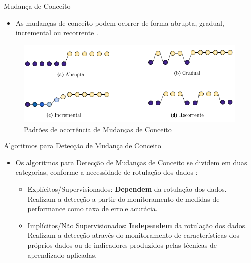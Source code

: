 \documentclass[10pt]{beamer}
\begin{document}
\begin{frame}{Mudança de Conceito}
    \begin{itemize}
        \item<1 -> As mudanças de conceito podem ocorrer de forma \alert{abrupta}, \alert{gradual}, \alert{incremental} ou \alert{recorrente} \cite{Zliobaite:2010}.
    \end{itemize}
    \begin{figure}[H]
        \begin{center}
            \includegraphics[scale=0.5]{imagens/concept_drift_patterns.png}
            \caption{Padrões de ocorrência de Mudanças de Conceito}
            \label{fig:concept_drift_patterns}
        \end{center}
    \end{figure}
\end{frame}

\begin{frame}{Algoritmos para Detecção de Mudança de Conceito}
    \begin{itemize}
        \item<1 -> Os algoritmos para Detecção de Mudanças de Conceito se dividem em duas categorias, conforme a necessidade de rotulação dos dados \cite{Zliobaite:2010}:
        \begin{itemize}
        \item<1 -> \alert{Explícitos/Supervisionados}: \textbf{Dependem} da rotulação dos dados. Realizam a detecção a partir do monitoramento de medidas de performance como taxa de erro e acurácia.
        \item<1 -> \alert{Implícitos/Não Supervisionados}: \textbf{Independem} da rotulação dos dados. Realizam a detecção através do monitoramento de características dos próprios dados ou de indicadores produzidos pelas técnicas de aprendizado aplicadas.
        \end{itemize}
    \end{itemize}
\end{frame}
\end{document}
